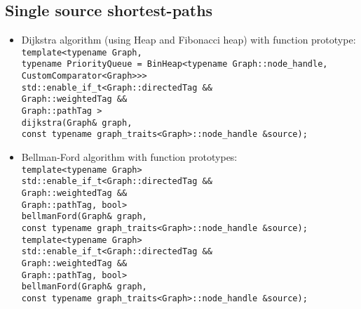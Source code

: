 \documentclass{article}
\begin{document}
\pagebreak

\subsection*{Single source shortest-paths}
\begin{itemize}
	\item Dijkstra algorithm (using Heap and Fibonacci heap) with function prototype:\\
		\texttt{template<typename Graph,\\\hspace*{4.75em}
			typename PriorityQueue = BinHeap<typename Graph::node\_handle,\\\hspace*{21em}
			CustomComparator<Graph>>>\\
			std::enable\_if\_t<Graph::directedTag \&\&\\\hspace*{7.67em}
			Graph::weightedTag \&\&\\\hspace*{7.67em}
			Graph::pathTag >\\
			dijkstra(Graph\& graph,\\\hspace*{4.27em}
			const typename graph\_traits<Graph>::node\_handle \&source);}

	\item Bellman-Ford algorithm with function prototypes:\\
		\texttt{template<typename Graph>\\
			std::enable\_if\_t<Graph::directedTag \&\&\\\hspace*{7.67em}
			Graph::weightedTag \&\&\\\hspace*{7.67em}
			Graph::pathTag, bool>\\
			bellmanFord(Graph\& graph,\\\hspace*{5.27em}
			const typename graph\_traits<Graph>::node\_handle \&source);} \\

		\texttt{template<typename Graph>\\
			std::enable\_if\_t<Graph::directedTag \&\&\\\hspace*{7.67em}
			Graph::weightedTag \&\&\\\hspace*{7.67em}
			Graph::pathTag, bool>\\
			bellmanFord(Graph\& graph,\\\hspace*{5.27em}
			const typename graph\_traits<Graph>::node\_handle \&source);}


\end{itemize}
\end{document}
